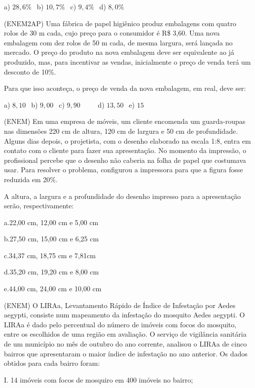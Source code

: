 \begin{multicols*}{2}
		      a) $28,6\% \ \ $ b) $10,7\% \ \ $ c) $ 9,4\% \ \ $ d) $ 8,0\% $

		\execnum (ENEM2AP) Uma fábrica de papel higiênico produz embalagens com quatro rolos de 30 m cada, cujo preço
		      para o consumidor é R\$ 3,60. Uma nova embalagem com dez rolos de 50 m cada, de mesma largura, será lançada no
		      mercado. O preço do produto na nova embalagem deve ser equivalente ao já produzido, mas, para incentivar as
		      vendas, inicialmente o preço de venda terá um desconto de 10\%.

		      Para que isso aconteça, o preço de venda da nova embalagem, em real, deve ser:

		      a) $8,10 \ \ $ b) $9,00 \ \ $ c) $9,90 \ \ \ \ \ \ \ \ \ \ $ d) $13,50 \ \ $ e) $15 \ \ $

		\execnum (ENEM) Em uma empresa de móveis, um cliente encomenda um guarda-roupas nas dimensões 220 cm de
		      altura, 120 cm de largura e 50 cm de profundidade. Alguns dias depois, o projetista, com o desenho elaborado na
		      escala 1:8, entra em contato com o cliente para fazer sua apresentação. No momento da impressão, o profissional
		      percebe que o desenho não caberia na folha de papel que costumava usar. Para resolver o problema, configurou a
		      impressora para que a figura fosse reduzida em 20\%.

		      A altura, a largura e a profundidade do desenho impresso para a apresentação serão, respectivamente:

		      a.22,00 cm, 12,00 cm e 5,00 cm

		      b.27,50 cm, 15,00 cm e 6,25 cm

		      c.34,37 cm, 18,75 cm e 7,81cm

		      d.35,20 cm, 19,20 cm e 8,00 cm

		      e.44,00 cm, 24,00 cm e 10,00 cm

		\execnum (ENEM) O LIRAa, Levantamento Rápido de Índice de Infestação por Aedes aegypti, consiste num mapeamento da infestação do mosquito Aedes aegypti. O LIRAa é dado pelo percentual do número de imóveis com focos do mosquito, entre os escolhidos de uma região em avaliação. O serviço de vigilância sanitária de um município no mês de outubro do ano corrente, analisou o LIRAa de cinco bairros que apresentaram o maior índice de infestação no ano anterior. Os dados obtidos para cada bairro foram:

		      I. 14 imóveis com focos de mosquiro em 400 imóveis no bairro;


\end{multicols*}
